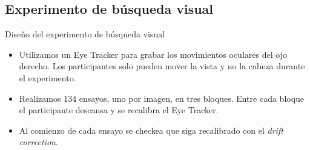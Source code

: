 \documentclass[compress]{beamer}
\begin{document}
\subsection{Experimento de búsqueda visual}
\begin{frame}{Diseño del experimento de búsqueda visual}

\begin{itemize}
\item Utilizamos un Eye Tracker para grabar los movimientos oculares del ojo derecho. Los participantes solo pueden mover la vista y no la cabeza durante el experimento.
\item Realizamos 134 ensayos, uno por imagen, en tres bloques. Entre cada bloque el participante descansa y se recalibra el Eye Tracker.
\item Al comienzo de cada ensayo se checkea que siga recalibrado con el \textit{drift correction}.
\end{itemize}

\end{frame}
\end{document}
